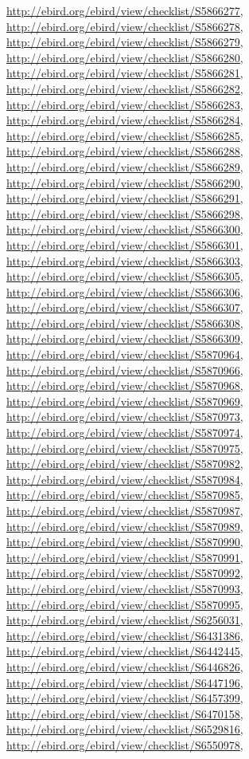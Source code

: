 \documentclass[9pt, article]{memoir}
\begin{document}
\begin{multicols}{2}
\url{http://ebird.org/ebird/view/checklist/S5866277}, 
\url{http://ebird.org/ebird/view/checklist/S5866278}, 
\url{http://ebird.org/ebird/view/checklist/S5866279}, 
\url{http://ebird.org/ebird/view/checklist/S5866280}, 
\url{http://ebird.org/ebird/view/checklist/S5866281}, 
\url{http://ebird.org/ebird/view/checklist/S5866282}, 
\url{http://ebird.org/ebird/view/checklist/S5866283}, 
\url{http://ebird.org/ebird/view/checklist/S5866284}, 
\url{http://ebird.org/ebird/view/checklist/S5866285}, 
\url{http://ebird.org/ebird/view/checklist/S5866288}, 
\url{http://ebird.org/ebird/view/checklist/S5866289}, 
\url{http://ebird.org/ebird/view/checklist/S5866290}, 
\url{http://ebird.org/ebird/view/checklist/S5866291}, 
\url{http://ebird.org/ebird/view/checklist/S5866298}, 
\url{http://ebird.org/ebird/view/checklist/S5866300}, 
\url{http://ebird.org/ebird/view/checklist/S5866301}, 
\url{http://ebird.org/ebird/view/checklist/S5866303}, 
\url{http://ebird.org/ebird/view/checklist/S5866305}, 
\url{http://ebird.org/ebird/view/checklist/S5866306}, 
\url{http://ebird.org/ebird/view/checklist/S5866307}, 
\url{http://ebird.org/ebird/view/checklist/S5866308}, 
\url{http://ebird.org/ebird/view/checklist/S5866309}, 
\url{http://ebird.org/ebird/view/checklist/S5870964}, 
\url{http://ebird.org/ebird/view/checklist/S5870966}, 
\url{http://ebird.org/ebird/view/checklist/S5870968}, 
\url{http://ebird.org/ebird/view/checklist/S5870969}, 
\url{http://ebird.org/ebird/view/checklist/S5870973}, 
\url{http://ebird.org/ebird/view/checklist/S5870974}, 
\url{http://ebird.org/ebird/view/checklist/S5870975}, 
\url{http://ebird.org/ebird/view/checklist/S5870982}, 
\url{http://ebird.org/ebird/view/checklist/S5870984}, 
\url{http://ebird.org/ebird/view/checklist/S5870985}, 
\url{http://ebird.org/ebird/view/checklist/S5870987}, 
\url{http://ebird.org/ebird/view/checklist/S5870989}, 
\url{http://ebird.org/ebird/view/checklist/S5870990}, 
\url{http://ebird.org/ebird/view/checklist/S5870991}, 
\url{http://ebird.org/ebird/view/checklist/S5870992}, 
\url{http://ebird.org/ebird/view/checklist/S5870993}, 
\url{http://ebird.org/ebird/view/checklist/S5870995}, 
\url{http://ebird.org/ebird/view/checklist/S6256031}, 
\url{http://ebird.org/ebird/view/checklist/S6431386}, 
\url{http://ebird.org/ebird/view/checklist/S6442445}, 
\url{http://ebird.org/ebird/view/checklist/S6446826}, 
\url{http://ebird.org/ebird/view/checklist/S6447196}, 
\url{http://ebird.org/ebird/view/checklist/S6457399}, 
\url{http://ebird.org/ebird/view/checklist/S6470158}, 
\url{http://ebird.org/ebird/view/checklist/S6529816}, 
\url{http://ebird.org/ebird/view/checklist/S6550978}, 

\end{multicols}
\end{document}
